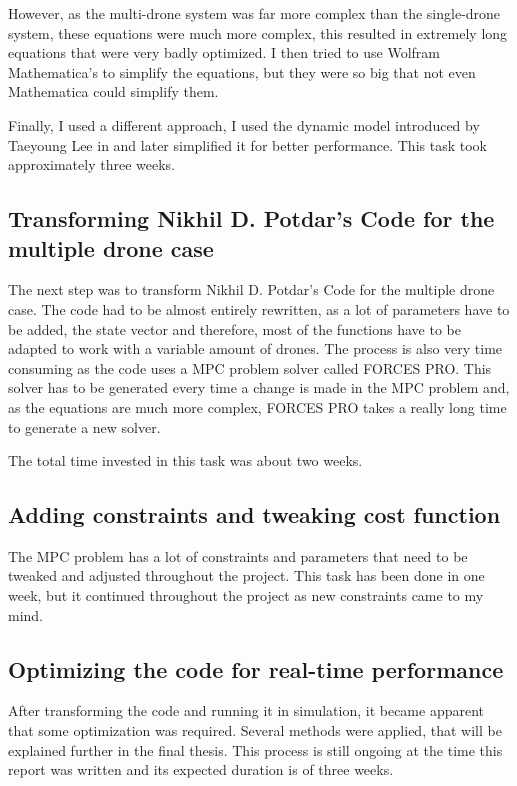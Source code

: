 However, as the multi-drone system was far more complex than the single-drone system, these equations were much more complex, this resulted in extremely long equations that were very badly optimized. I then tried to use Wolfram Mathematica's  to simplify the equations, but they were so big that not even Mathematica could simplify them.

Finally, I used a different approach, I used the dynamic model introduced by Taeyoung Lee in \cite{Lee2013} and later simplified it for better performance. This task took approximately three weeks.

\subsection{Transforming Nikhil D. Potdar's Code for the multiple drone case}

The next step was to transform Nikhil D. Potdar's Code for the multiple drone case. The code had to be almost entirely rewritten, as a lot of parameters have to be added, the state vector and therefore, most of the functions have to be adapted to work with a variable amount of drones. The process is also very time consuming as the code uses a \ac{MPC} problem solver called FORCES PRO. This solver has to be generated every time a change is made in the \ac{MPC} problem and, as the equations are much more complex, FORCES PRO takes a really long time to generate a new solver.

The total time invested in this task was about two weeks.

\subsection{Adding constraints and tweaking cost function}
The \ac{MPC} problem has a lot of constraints and parameters that need to be tweaked and adjusted throughout the project. This task has been done in one week, but it continued throughout the project as new constraints came to my mind.

\subsection{Optimizing the code for real-time performance}
After transforming the code and running it in simulation, it became apparent that some optimization was required. Several methods  were applied, that will be explained further in the final thesis. This process is still ongoing at the time this report was written and its expected duration is of three weeks.

